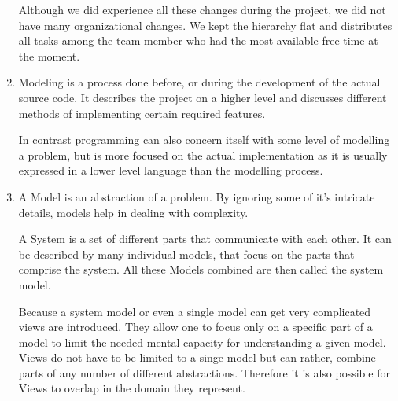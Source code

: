 \documentclass[a4paper, 10pt]{article}
\begin{document}
\begin{enumerate}
	      Although we did experience all these changes during the project, we did not have many organizational changes.
	      We kept the hierarchy flat and distributes all tasks among the team member who had the most
	      available free time at the moment.
	\item
	      Modeling is a process done before, or during the development of the
	      actual source code. It describes the project on a higher level and discusses
	      different methods of implementing certain required features.

	      In contrast programming can also concern itself with some level of modelling a problem, but
	      is more focused on the actual implementation as it is usually expressed in a lower level language than
	      the modelling process.
	\item
		A Model is an abstraction of a problem. By ignoring some of it's intricate details, models help in dealing
		with complexity.

		A System is a set of different parts that communicate with each other. It can be described by many individual models, 
		that focus on the parts that comprise the system. All these Models combined are then called the system model. 

		Because a system model or even a single model can get very complicated views are introduced. They allow one to focus 
		only on a specific part of a model to limit the needed mental capacity for understanding a given model.
		Views do not have to be limited to a singe model but can rather, combine parts of any number of different abstractions.
		Therefore it is also possible for Views to overlap in the domain they represent.
\end{enumerate}
\end{document}
